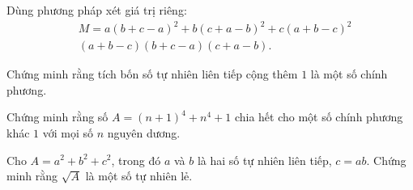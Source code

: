 \begin{bt}%
	Dùng phương pháp xét giá trị riêng:
	\begin{align*}
	&M= a(b+c-a)^2+b(c+a-b)^2+c(a+b-c)^2\\
	&(a+b-c)(b+c-a)(c+a-b).
	\end{align*}
\end{bt}
\begin{bt}%
	Chứng minh rằng tích bốn số tự nhiên liên tiếp cộng thêm $1$ là một số chính phương.
\end{bt}
\begin{bt}%
	Chứng minh rằng số $A=(n+1)^4+n^4+1$ chia hết cho một số chính phương khác $1$ với mọi số $n$ nguyên dương.
\end{bt}
\begin{bt}%
	Cho $A=a^2+b^2+c^2$, trong đó $a$ và $b$ là hai số tự nhiên liên tiếp, $c=ab$. Chứng minh rằng $\sqrt{A}$ là một số tự nhiên lẻ.
\end{bt}